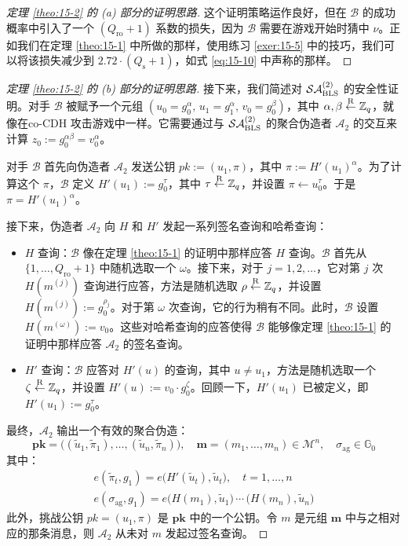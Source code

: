 \begin{proof}[定理 \ref{theo:15-2} 的 (a) 部分的证明思路]
这个证明策略运作良好，但在 $\mathcal{B}$ 的成功概率中引入了一个 $(Q_\mathrm{ro}+1)$ 系数的损失，因为 $\mathcal{B}$ 需要在游戏开始时猜中 $\nu$。正如我们在定理 \ref{theo:15-1} 中所做的那样，使用练习 \ref{exer:15-5} 中的技巧，我们可以将该损失减少到 $2.72\cdot(Q_\mathrm{s}+1)$，如式 \ref{eq:15-10} 中声称的那样。
\end{proof}

\begin{proof}[定理 \ref{theo:15-2} 的 (b) 部分的证明思路]
接下来，我们简述对 $\mathcal{SA}_{\rm BLS}^{(2)}$ 的安全性证明。对手 $\mathcal{B}$ 被赋予一个元组 $(u_0=g_0^\alpha,\,u_1=g_1^\alpha,\,v_0=g_0^\beta)$，其中 $\alpha,\beta\overset{\rm R}\leftarrow\mathbb{Z}_q$，就像在co-CDH 攻击游戏中一样。它需要通过与 $\mathcal{SA}_{\rm BLS}^{(2)}$ 的聚合伪造者 $\mathcal{A}_2$ 的交互来计算 $z_0:=g_0^{\alpha\beta}=v_0^\alpha$。

对手 $\mathcal{B}$ 首先向伪造者 $\mathcal{A}_2$ 发送公钥 $pk:=(u_1,\pi)$，其中 $\pi:=H'(u_1)^\alpha$。为了计算这个 $\pi$，$\mathcal{B}$ 定义 $H'(u_1):=g_0^\tau$，其中 $\tau\overset{\rm R}\leftarrow\mathbb{Z}_q$，并设置 $\pi\leftarrow u_0^\tau$。于是 $\pi=H'(u_1)^\alpha$。

接下来，伪造者 $\mathcal{A}_2$ 向 $H$ 和 $H'$ 发起一系列签名查询和哈希查询：
\begin{itemize}
	\item $H$ 查询：$\mathcal{B}$ 像在定理 \ref{theo:15-1} 的证明中那样应答 $H$ 查询。$\mathcal{B}$ 首先从 $\{1,\dots,Q_\mathrm{ro}+1\}$ 中随机选取一个 $\omega$。接下来，对于 $j=1,2,\dots$，它对第 $j$ 次 $H(m^{(j)})$ 查询进行应答，方法是随机选取 $\rho\overset{\rm R}\leftarrow\mathbb{Z}_q$，并设置 $H(m^{(j)}):=g_0^{\rho_j}$。对于第 $\omega$ 次查询，它的行为稍有不同。此时，$\mathcal{B}$ 设置 $H(m^{(\omega)}):=v_0$。这些对哈希查询的应答使得 $\mathcal{B}$ 能够像定理 \ref{theo:15-1} 的证明中那样应答 $\mathcal{A}_2$ 的签名查询。
	\item $H'$ 查询：$\mathcal{B}$ 应答对 $H'(u)$ 的查询，其中 $u\neq u_1$，方法是随机选取一个 $\zeta\overset{\rm R}\leftarrow\mathbb{Z}_q$，并设置 $H'(u):=v_0\cdot g_0^\zeta$。回顾一下，$H'(u_1)$ 已被定义，即 $H'(u_1):=g_0^\tau$。
\end{itemize}
最终，$\mathcal{A}_2$ 输出一个有效的聚合伪造：
\begin{equation}\label{eq:15-14}
\boldsymbol{pk}=\big((\tilde{u}_1,\tilde{\pi}_1),\dots,(\tilde{u}_n,\tilde{\pi}_n)\big),
\quad
\boldsymbol{m}=(m_1,\dots,m_n)\in\mathcal{M}^n,
\quad
\sigma_\mathrm{ag}\in\mathbb{G}_0
\end{equation}
其中：
\begin{gather}
	e(\tilde{\pi}_t,g_1)=e\big(H'(\tilde{u}_t),\tilde{u}_t\big),\quad t=1,\dots,n \label{eq:15-15}\\
	e(\sigma_\mathrm{ag},g_1)
	=e\big(H(m_1),\tilde{u}_1\big)\,\cdots\,\big(H(m_n),\tilde{u}_n\big) \label{eq:15-16}
\end{gather}
此外，挑战公钥 $pk=(u_1,\pi)$ 是 $\boldsymbol{pk}$ 中的一个公钥。令 $m$ 是元组 $\boldsymbol{m}$ 中与之相对应的那条消息，则 $\mathcal{A}_2$ 从未对 $m$ 发起过签名查询。


\end{proof}
